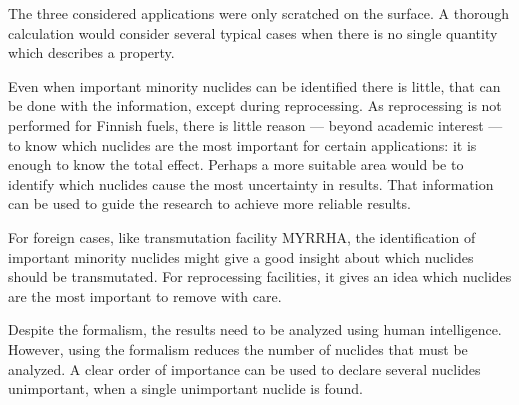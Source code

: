 The three considered applications were only scratched on the surface. A thorough calculation would consider several typical cases when there is no single quantity which describes a property.

Even when important minority nuclides can be identified there is little, that can be done with the information, except during reprocessing. As reprocessing is not performed for Finnish fuels, there is little reason --- beyond academic interest --- to know which nuclides are the most important for certain applications: it is enough to know the total effect. Perhaps a more suitable area would be to identify which nuclides cause the most uncertainty in results. That information can be used to guide the research to achieve more reliable results.

For foreign cases, like transmutation facility MYRRHA, the identification of important minority nuclides might give a good insight about which nuclides should be transmutated. For reprocessing facilities, it gives an idea which nuclides are the most important to remove with care.

Despite the formalism, the results need to be analyzed using human intelligence. However, using the formalism reduces the number of nuclides that must be analyzed. A clear order of importance can be used to declare several nuclides unimportant, when a single unimportant nuclide is found.















